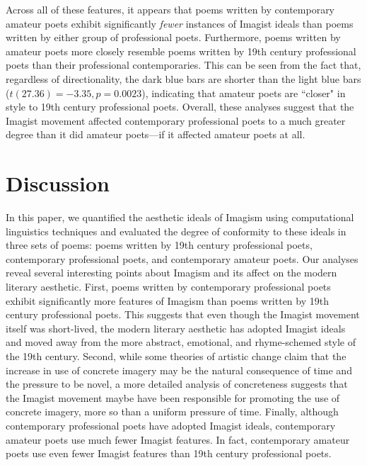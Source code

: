 \documentclass{book}
\begin{document}
Across all of these features, it appears that poems written by contemporary amateur poets exhibit significantly \emph{fewer} instances of Imagist ideals than poems written by either group of professional poets. Furthermore, poems written by amateur poets more closely resemble poems written by 19th century professional poets than their professional contemporaries. This can be seen from the fact that, regardless of directionality, the dark blue bars are shorter than the light blue bars ($t(27.36) = -3.35, p = 0.0023$), indicating that amateur poets are ``closer" in style to 19th century professional poets. Overall, these analyses suggest that the Imagist movement affected contemporary professional poets to a much greater degree than it did amateur poets---if it affected amateur poets at all.




\section{Discussion}
In this paper, we quantified the aesthetic ideals of Imagism using computational linguistics techniques and evaluated the degree of conformity to these ideals in three sets of poems: poems written by 19th century professional poets, contemporary professional poets, and contemporary amateur poets. Our analyses reveal several interesting points about Imagism and its affect on the modern literary aesthetic. First, poems written by contemporary professional poets exhibit significantly more features of Imagism than poems written by 19th century professional poets. This suggests that even though the Imagist movement itself was short-lived, the modern literary aesthetic has adopted Imagist ideals and moved away from the more abstract, emotional, and rhyme-schemed style of the 19th century. Second, while some theories of artistic change claim that the increase in use of concrete imagery may be the natural consequence of time and the pressure to be novel, a more detailed analysis of concreteness suggests that the Imagist movement maybe have been responsible for promoting the use of concrete imagery, more so than a uniform pressure of time. Finally, although contemporary professional poets have adopted Imagist ideals, contemporary amateur poets use much fewer Imagist features. In fact, contemporary amateur poets use even fewer Imagist features than 19th century professional poets. 
\end{document}
